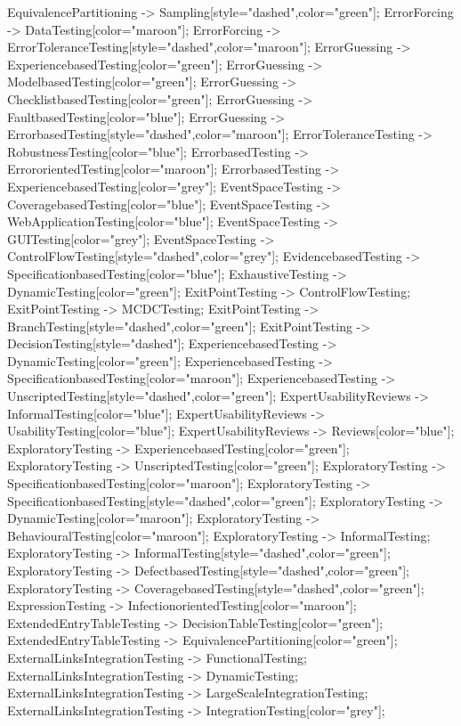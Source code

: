 \documentclass{article}
\begin{document}
{EquivalencePartitioning -> Sampling[style="dashed",color="green"];
ErrorForcing -> DataTesting[color="maroon"];
ErrorForcing -> ErrorToleranceTesting[style="dashed",color="maroon"];
ErrorGuessing -> ExperiencebasedTesting[color="green"];
ErrorGuessing -> ModelbasedTesting[color="green"];
ErrorGuessing -> ChecklistbasedTesting[color="green"];
ErrorGuessing -> FaultbasedTesting[color="blue"];
ErrorGuessing -> ErrorbasedTesting[style="dashed",color="maroon"];
ErrorToleranceTesting -> RobustnessTesting[color="blue"];
ErrorbasedTesting -> ErrororientedTesting[color="maroon"];
ErrorbasedTesting -> ExperiencebasedTesting[color="grey"];
EventSpaceTesting -> CoveragebasedTesting[color="blue"];
EventSpaceTesting -> WebApplicationTesting[color="blue"];
EventSpaceTesting -> GUITesting[color="grey"];
EventSpaceTesting -> ControlFlowTesting[style="dashed",color="grey"];
EvidencebasedTesting -> SpecificationbasedTesting[color="blue"];
ExhaustiveTesting -> DynamicTesting[color="green"];
ExitPointTesting -> ControlFlowTesting;
ExitPointTesting -> MCDCTesting;
ExitPointTesting -> BranchTesting[style="dashed",color="green"];
ExitPointTesting -> DecisionTesting[style="dashed"];
ExperiencebasedTesting -> DynamicTesting[color="green"];
ExperiencebasedTesting -> SpecificationbasedTesting[color="maroon"];
ExperiencebasedTesting -> UnscriptedTesting[style="dashed",color="green"];
ExpertUsabilityReviews -> InformalTesting[color="blue"];
ExpertUsabilityReviews -> UsabilityTesting[color="blue"];
ExpertUsabilityReviews -> Reviews[color="blue"];
ExploratoryTesting -> ExperiencebasedTesting[color="green"];
ExploratoryTesting -> UnscriptedTesting[color="green"];
ExploratoryTesting -> SpecificationbasedTesting[color="maroon"];
ExploratoryTesting -> SpecificationbasedTesting[style="dashed",color="green"];
ExploratoryTesting -> DynamicTesting[color="maroon"];
ExploratoryTesting -> BehaviouralTesting[color="maroon"];
ExploratoryTesting -> InformalTesting;
ExploratoryTesting -> InformalTesting[style="dashed",color="green"];
ExploratoryTesting -> DefectbasedTesting[style="dashed",color="green"];
ExploratoryTesting -> CoveragebasedTesting[style="dashed",color="green"];
ExpressionTesting -> InfectionorientedTesting[color="maroon"];
ExtendedEntryTableTesting -> DecisionTableTesting[color="green"];
ExtendedEntryTableTesting -> EquivalencePartitioning[color="green"];
ExternalLinksIntegrationTesting -> FunctionalTesting;
ExternalLinksIntegrationTesting -> DynamicTesting;
ExternalLinksIntegrationTesting -> LargeScaleIntegrationTesting;
ExternalLinksIntegrationTesting -> IntegrationTesting[color="grey"];
}
\end{document}
